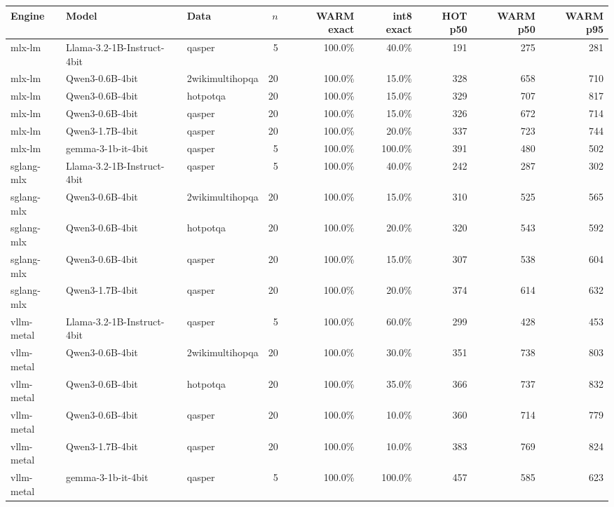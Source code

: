 \begin{tabular}{lllrrrrrr}
\toprule
Engine & Model & Data & $n$ & WARM exact & int8 exact & HOT p50 & WARM p50 & WARM p95 \\
\midrule
mlx-lm & Llama-3.2-1B-Instruct-4bit & qasper & 5 & 100.0\% & 40.0\% & 191 & 275 & 281 \\
mlx-lm & Qwen3-0.6B-4bit & 2wikimultihopqa & 20 & 100.0\% & 15.0\% & 328 & 658 & 710 \\
mlx-lm & Qwen3-0.6B-4bit & hotpotqa & 20 & 100.0\% & 15.0\% & 329 & 707 & 817 \\
mlx-lm & Qwen3-0.6B-4bit & qasper & 20 & 100.0\% & 15.0\% & 326 & 672 & 714 \\
mlx-lm & Qwen3-1.7B-4bit & qasper & 20 & 100.0\% & 20.0\% & 337 & 723 & 744 \\
mlx-lm & gemma-3-1b-it-4bit & qasper & 5 & 100.0\% & 100.0\% & 391 & 480 & 502 \\
sglang-mlx & Llama-3.2-1B-Instruct-4bit & qasper & 5 & 100.0\% & 40.0\% & 242 & 287 & 302 \\
sglang-mlx & Qwen3-0.6B-4bit & 2wikimultihopqa & 20 & 100.0\% & 15.0\% & 310 & 525 & 565 \\
sglang-mlx & Qwen3-0.6B-4bit & hotpotqa & 20 & 100.0\% & 20.0\% & 320 & 543 & 592 \\
sglang-mlx & Qwen3-0.6B-4bit & qasper & 20 & 100.0\% & 15.0\% & 307 & 538 & 604 \\
sglang-mlx & Qwen3-1.7B-4bit & qasper & 20 & 100.0\% & 20.0\% & 374 & 614 & 632 \\
vllm-metal & Llama-3.2-1B-Instruct-4bit & qasper & 5 & 100.0\% & 60.0\% & 299 & 428 & 453 \\
vllm-metal & Qwen3-0.6B-4bit & 2wikimultihopqa & 20 & 100.0\% & 30.0\% & 351 & 738 & 803 \\
vllm-metal & Qwen3-0.6B-4bit & hotpotqa & 20 & 100.0\% & 35.0\% & 366 & 737 & 832 \\
vllm-metal & Qwen3-0.6B-4bit & qasper & 20 & 100.0\% & 10.0\% & 360 & 714 & 779 \\
vllm-metal & Qwen3-1.7B-4bit & qasper & 20 & 100.0\% & 10.0\% & 383 & 769 & 824 \\
vllm-metal & gemma-3-1b-it-4bit & qasper & 5 & 100.0\% & 100.0\% & 457 & 585 & 623 \\
\bottomrule
\end{tabular}
